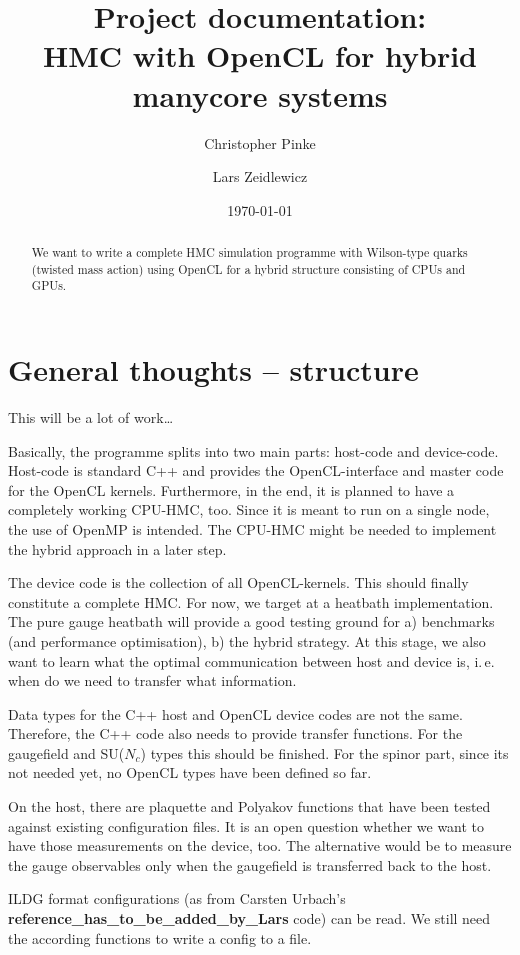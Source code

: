 \documentclass[a4paper,11pt]{article}
\title{Project documentation:\\
       \textbf{HMC with OpenCL for hybrid manycore systems}
}
\author{Christopher Pinke \and Lars Zeidlewicz}
\date{\today}
\begin{document}
\maketitle
\begin{abstract}
We want to write a complete HMC simulation programme with Wilson-type quarks (twisted mass action) using OpenCL for a hybrid structure consisting of CPUs and GPUs.
\end{abstract}

\tableofcontents

\newpage

\section{General thoughts -- structure}
This will be a lot of work\ldots

Basically, the programme splits into two main parts: host-code and device-code. Host-code is standard C++ and provides the OpenCL-interface and master code for the OpenCL kernels. Furthermore, in the end, it is planned to have a completely working CPU-HMC, too. Since it is meant to run on a single node, the use of OpenMP is intended. The CPU-HMC might be needed to implement the hybrid approach in a later step.

The device code is the collection of all OpenCL-kernels. This should finally constitute a complete HMC. For now, we target at a heatbath implementation. The pure gauge heatbath will provide a good testing ground for a) benchmarks (and performance optimisation), b) the hybrid strategy. At this stage, we also want to learn what the optimal communication between host and device is, i.\,e. when do we need to transfer what information.

Data types for the C++ host and OpenCL device codes are not the same. Therefore, the C++ code also needs to provide transfer functions. For the gaugefield and SU($N_c$) types this should be finished. For the spinor part, since its not needed yet, no OpenCL types have been defined so far.

On the host, there are plaquette and Polyakov functions that have been tested against existing configuration files. It is an open question whether we want to have those measurements on the device, too. The alternative would be to measure the gauge observables only when the gaugefield is transferred back to the host.

ILDG format configurations (as from Carsten Urbach's {\bf reference\_has\_to\_be\_added\_by\_Lars} code) can be read. We still need the according functions to write a config to a file.
\end{document}
